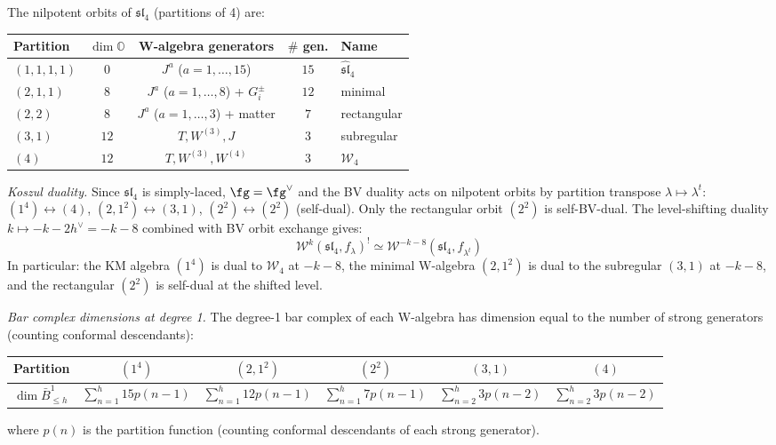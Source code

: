 \begin{computation}
\label{comp:sl4-ds-hierarchy}

The nilpotent orbits of $\mathfrak{sl}_4$ (partitions of 4) are:
\begin{center}
\renewcommand{\arraystretch}{1.2}
\begin{tabular}{lcccl}
\textbf{Partition} & $\dim \mathbb{O}$ &
\textbf{W-algebra generators} & $\#$ gen. & \textbf{Name} \\
\hline
$(1,1,1,1)$ & $0$ & $J^a$ ($a = 1,\ldots,15$) & $15$ &
$\widehat{\mathfrak{sl}}_4$ \\
$(2,1,1)$ & $8$ & $J^a$ ($a=1,\ldots,8$) + $G^\pm_i$ & $12$ &
minimal \\
$(2,2)$ & $8$ & $J^a$ ($a=1,\ldots,3$) + matter & $7$ &
rectangular \\
$(3,1)$ & $12$ & $T, W^{(3)}, J$ & $3$ & subregular \\
$(4)$ & $12$ & $T, W^{(3)}, W^{(4)}$ & $3$ &
$\mathcal{W}_4$
\end{tabular}
\end{center}

\emph{Koszul duality.}
Since $\mathfrak{sl}_4$ is simply-laced, $\fg = \fg^\vee$ and the
BV duality acts on nilpotent orbits by partition transpose
$\lambda \mapsto \lambda^t$:
$(1^4) \leftrightarrow (4)$, $(2,1^2) \leftrightarrow (3,1)$,
$(2^2) \leftrightarrow (2^2)$ (self-dual).
Only the rectangular orbit $(2^2)$ is self-BV-dual.
The level-shifting duality $k \mapsto -k-2h^\vee = -k-8$ combined
with BV orbit exchange gives:
\[
\mathcal{W}^k(\mathfrak{sl}_4, f_\lambda)^!
\simeq \mathcal{W}^{-k-8}(\mathfrak{sl}_4, f_{\lambda^t})
\]
In particular: the KM algebra $(1^4)$ is dual to $\mathcal{W}_4$
at $-k-8$, the minimal W-algebra $(2,1^2)$ is dual to the
subregular $(3,1)$ at $-k-8$, and the rectangular $(2^2)$ is
self-dual at the shifted level.

\emph{Bar complex dimensions at degree 1.}
The degree-1 bar complex of each W-algebra has dimension equal
to the number of strong generators (counting conformal descendants):
\begin{center}
\renewcommand{\arraystretch}{1.2}
{\small
\begin{tabular}{l|ccccc}
Partition & $(1^4)$ & $(2,1^2)$ & $(2^2)$ & $(3,1)$ & $(4)$ \\
\hline
$\dim \bar{B}^1_{\leq h}$ &
$\sum_{n=1}^{h} 15 p(n\!-\!1)$ &
$\sum_{n=1}^{h} 12 p(n\!-\!1)$ &
$\sum_{n=1}^{h} 7 p(n\!-\!1)$ &
$\sum_{n=2}^{h} 3 p(n\!-\!2)$ &
$\sum_{n=2}^{h} 3 p(n\!-\!2)$
\end{tabular}
}
\end{center}
where $p(n)$ is the partition function (counting conformal
descendants of each strong generator).
\end{computation}
